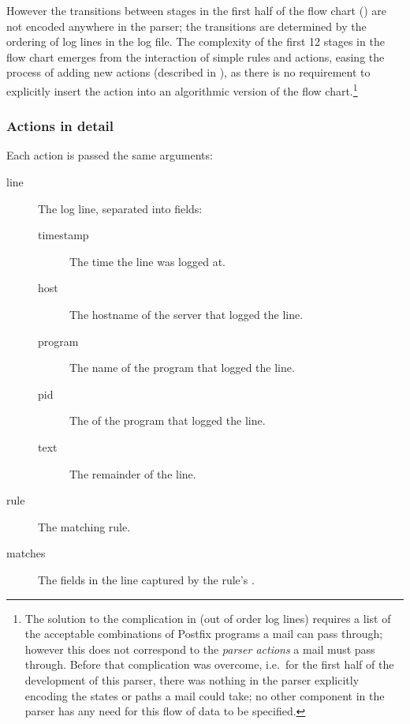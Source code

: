 However the transitions between stages in the first half of the flow chart
() are not encoded anywhere in
the parser; the transitions are determined by the ordering of log lines in
the log file.  The complexity of the first 12 stages in the flow chart
emerges from the interaction of simple rules and actions, easing the
process of adding new actions (described in ), as there is no requirement to explicitly insert the action into
an algorithmic version of the flow chart.\footnote{The solution to the
complication in  (out of order log
lines) requires a list of the acceptable combinations of Postfix programs a
mail can pass through; however this does not correspond to the
\textit{parser actions\/} a mail must pass through.  Before that
complication was overcome, i.e.\ for the first half of the development of
this parser, there was nothing in the parser explicitly encoding the states
or paths a mail could take; no other component in the parser has any need
for this flow of data to be specified.}



\subsubsection{Actions in detail}

\label{actions-in-detail}

Each action is passed the same arguments:

\begin{description}

    \item [line] The log line, separated into fields:

        \begin{description}

            \item [timestamp] The time the line was logged at.

            \item [host] The hostname of the server that logged the line.

            \item [program] The name of the program that logged the line.

            \item [pid] The \pid{} of the program that logged the line.

            \item [text] The remainder of the line.

        \end{description}

    \item [rule] The matching rule.

    \item [matches] The fields in the line captured by the rule's \regex{}.

\end{description}

